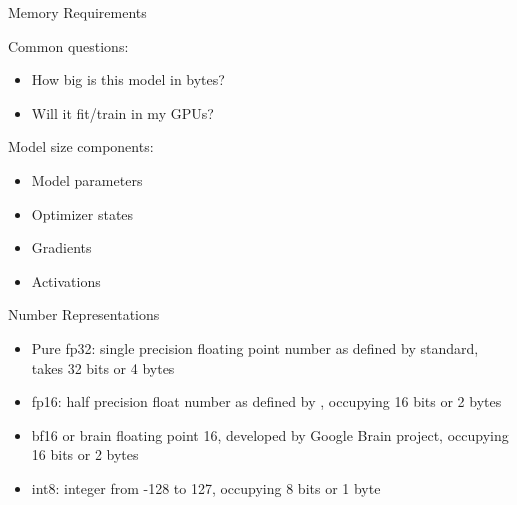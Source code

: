 
\begin{vbframe}{Memory Requirements}

\vfill

Common questions: \newline

\begin{itemize}
 	\item How big is this model in bytes?
	\item Will it fit/train in my GPUs?
\end{itemize}

\vskip8mm

Model size components: \newline

\begin{itemize}
 	\item Model parameters
	\item Optimizer states
	\item Gradients
	\item Activations
\end{itemize}

\vfill

\end{vbframe}


\begin{vbframe}{Number Representations}

\vfill

\begin{itemize}
 	\item Pure fp32: single precision floating point number as defined by  standard, takes 32 bits or 4 bytes
 	\item fp16: half precision float number as defined by , occupying 16 bits or 2 bytes 
    \item bf16 or brain floating point 16, developed by Google Brain project, occupying 16 bits or 2 bytes
	\item int8: integer from -128 to 127, occupying 8 bits or 1 byte
\end{itemize}

\vfill

\end{vbframe}

